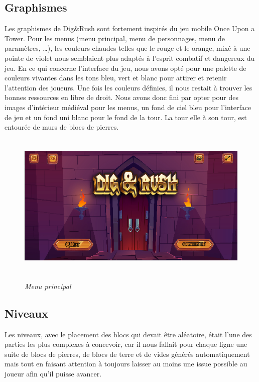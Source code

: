 \documentclass[a4paper,12pt]{article}
\begin{document}
\subsection{Graphismes}
Les graphismes de Dig\&Rush sont fortement inspirés du jeu mobile Once Upon a Tower.
Pour les menus (menu principal, menu de personnages, menu de paramètres, \dots), les couleurs  chaudes telles que le rouge et le orange, mixé à une pointe de violet nous semblaient plus adaptés à l'esprit combatif et dangereux du jeu. 
En ce qui concerne l'interface du jeu, nous avons opté pour une palette de couleurs vivantes dans les tons bleu, vert et blanc pour attirer et retenir l'attention des joueurs.
Une fois les couleurs définies, il nous restait à trouver les bonnes ressources en libre de droit. Nous avons donc fini par opter pour des images d'intérieur médiéval pour les menus, un fond de ciel bleu pour l'interface de jeu et un fond uni blanc pour le fond de la tour.
La tour elle à son tour, est entourée de murs de blocs de pierres.
\begin{figure}[h]
	\begin{center}
		\includegraphics[height=7cm]{img/menu.png}\\
		\caption{{\emph{Menu principal}}}
		\label{menu}
	\end{center}
\end{figure}

\subsection{Niveaux}
Les niveaux, avec le placement des blocs qui devait être aléatoire, était l'une des parties les plus complexes à concevoir, car il nous fallait pour chaque ligne une suite de blocs de pierres, de blocs de terre et de vides générés automatiquement mais tout en faisant attention à toujours laisser au moins une issue possible au joueur afin qu'il puisse avancer.
\end{document}
